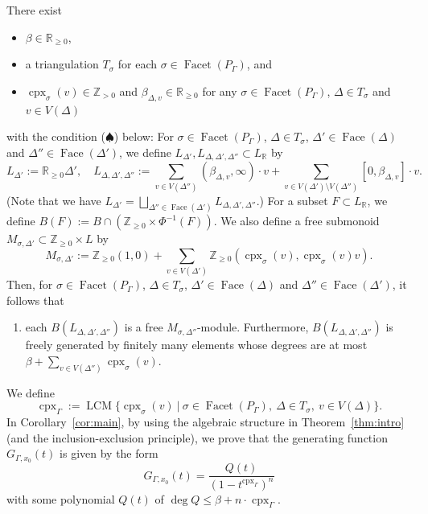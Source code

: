 \begin{thm}\label{thm:intro}
There exist 
\begin{itemize}
\item $\beta \in \mathbb{R}_{\ge 0}$, 
\item a triangulation $T_{\sigma}$ for each $\sigma \in \operatorname{Facet}(P_{\Gamma})$, and 
\item $\operatorname{cpx}_{\sigma} (v) \in \mathbb{Z}_{>0}$ and $\beta _{\Delta , v} \in \mathbb{R}_{\ge 0}$ for any $\sigma \in \operatorname{Facet}(P_{\Gamma})$, $\Delta \in T_{\sigma}$ and $v \in V(\Delta)$
\end{itemize}
with the condition ($\spadesuit$) below: 
For $\sigma \in \operatorname{Facet}(P_{\Gamma})$, $\Delta \in T_{\sigma}$, $\Delta' \in \operatorname{Face}(\Delta)$ and $\Delta'' \in \operatorname{Face}(\Delta')$, we define $L_{\Delta'}, L_{\Delta, \Delta', \Delta''} \subset L_{\mathbb{R}}$ by
\[
L_{\Delta'} := \mathbb{R}_{\ge 0} \Delta', \quad 
L_{\Delta, \Delta', \Delta''} := 
\sum_{v \in V(\Delta'')} (\beta _{\Delta , v}, \infty) \cdot v + 
\sum_{v \in V(\Delta') \setminus V(\Delta'')} [0,\beta _{\Delta , v}] \cdot v. 
\]
(Note that we have $L_{\Delta'} 
= 
\bigsqcup\limits_{\Delta'' \in \operatorname{Face}(\Delta')} 
L_{\Delta, \Delta', \Delta''}$.)
For a subset $F \subset L_{\mathbb{R}}$, we define $B \left( F \right) := B \cap \left( \mathbb{Z}_{\ge 0} \times \Phi^{-1} \left( F \right) \right)$. 
We also define a free submonoid $M_{\sigma , \Delta'} \subset \mathbb{Z}_{\ge 0} \times L$ by 
\[
M_{\sigma , \Delta'} := 
\mathbb{Z}_{\ge 0}(1,0) + 
\sum _{v \in V(\Delta')} \mathbb{Z}_{\ge 0} \left( \operatorname{cpx}_{\sigma} (v), \operatorname{cpx}_{\sigma} (v) v \right). 
\]
Then, for $\sigma \in \operatorname{Facet}(P_{\Gamma})$, $\Delta \in T_{\sigma}$, $\Delta' \in \operatorname{Face}(\Delta)$ and $\Delta'' \in \operatorname{Face}(\Delta')$, it follows that 
\begin{enumerate}
\item[($\spadesuit$)]
each $B \left( L_{\Delta, \Delta', \Delta''} \right)$ is a free $M_{\sigma , \Delta''}$-module. Furthermore, $B \left( L_{\Delta, \Delta', \Delta''} \right)$ is freely generated by finitely many elements whose degrees are at most $\beta + \sum _{v \in V(\Delta'')} \operatorname{cpx}_{\sigma} (v)$. 
\end{enumerate}
\end{thm}
\noindent
We define 
\[
\operatorname{cpx}_{\Gamma} :=
\operatorname{LCM} \bigl\{ \operatorname{cpx}_{\sigma}(v) \ \big | \ \sigma \in \operatorname{Facet}(P _{\Gamma}),\ \Delta \in T_{\sigma},\ v \in V(\Delta) \bigr \}.
\]
In Corollary~\ref{cor:main}, by using the algebraic structure in Theorem~\ref{thm:intro} (and the inclusion-exclusion principle), we prove that the generating function $G_{\Gamma, x_0}(t)$ is given by the form
\[
G_{\Gamma, x_0}(t) = \frac{Q(t)}{(1-t^{\operatorname{cpx}_{\Gamma}}) ^n}
\]
with some polynomial $Q(t)$ of $\deg Q \le \beta + n \cdot \operatorname{cpx}_{\Gamma}$. 

